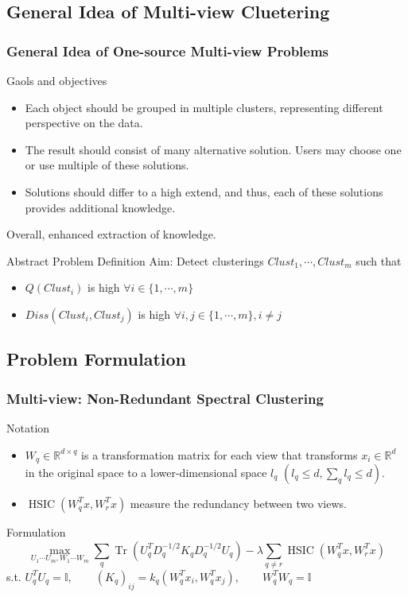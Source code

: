 \documentclass{beamer}
\DeclareMathOperator{\Tr}{Tr}
\DeclareMathOperator{\HSIC}{HSIC}
\begin{document}
\subsection{General Idea of Multi-view Cluetering}
\begin{frame}
\frametitle{General Idea of One-source Multi-view Problems}
	\begin{block}{Gaols and objectives}
	\begin{itemize}
		\item{Each object should be grouped in multiple clusters, representing different perspective on the data.}
		\item{The result should consist of many alternative solution. Users may choose one or use multiple of these solutions.}
		\item{Solutions should differ to a high extend, and thus, each of these solutions provides additional knowledge.}
	\end{itemize}
Overall, enhanced extraction of knowledge.
	\end{block}
	\begin{block}{Abstract Problem Definition}
	Aim: Detect clusterings $Clust_1,\cdots,Clust_m$ such that
		\begin{itemize}
			\item{$Q(Clust_i)$ is high $\forall i\in\{1,\cdots,m\}$ }
			\item{$Diss(Clust_i,Clust_j)$ is high $\forall i,j\in\{1,\cdots,m\},i\neq j$}
		\end{itemize}
	\end{block}
\end{frame}
\subsection{Problem Formulation}
\begin{frame}
\frametitle{Multi-view: Non-Redundant Spectral Clustering}
\begin{block}{Notation}
\begin{itemize}
\item{$W_q\in\mathbb{R}^{d\times q}$ is a transformation matrix for each view that transforms $x_i\in\mathbb{R}^d$ in the original space to a lower-dimensional space $l_q$ $(l_q\leq d,\sum_ql_q\leq d).$}
\item{$\HSIC(W_q^Tx,W_r^Tx)$ measure the redundancy between two views.}
\end{itemize}
\end{block}
\begin{block}{Formulation}
\begin{equation}
\max_{U_1\cdots U_m,W_1\cdots W_m}\sum_{q}\Tr(U_q^TD_q^{-1/2}K_qD_q^{-1/2}U_q)-\lambda\sum_{q\neq r}\HSIC(W_q^Tx,W_r^Tx)
\end{equation}
s.t. $U_q^TU_q=\mathds{I},\qquad (K_q)_{ij}=k_q(W_q^Tx_i,W_q^Tx_j),\qquad W_q^TW_q=\mathds{I}$
\end{block}
\end{frame}
\end{document}

